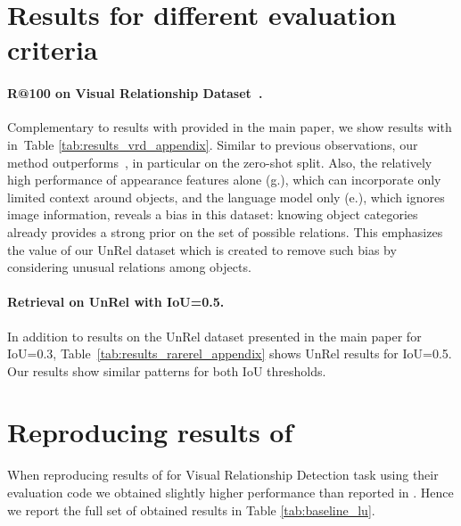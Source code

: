 \documentclass[10pt,twocolumn,letterpaper]{article}
\begin{document}
\section{Results for different evaluation criteria}
\label{part:quantitative}

\paragraph{R@100 on Visual Relationship Dataset~\cite{Lu16}.} Complementary to results with  provided in the main paper, we show results with  in~Table \ref{tab:results_vrd_appendix}. Similar to previous observations, our method outperforms~\cite{Lu16,Sadeghi2011}, in particular on the zero-shot split. Also, the relatively high performance of appearance features alone (g.), which can incorporate only limited context around objects, and the language model only (e.), which ignores image information, reveals a bias in this dataset: knowing object categories already provides a strong prior on the set of possible relations. This emphasizes the value of our UnRel dataset which is created to remove such bias by considering unusual relations among objects.

\paragraph{Retrieval on UnRel with IoU=0.5.}
In addition to results on the UnRel dataset presented in the main paper for IoU=0.3, Table~\ref{tab:results_rarerel_appendix} shows UnRel results for IoU=0.5. Our results show similar patterns for both IoU thresholds. 

\section{Reproducing results of \cite{Lu16}}
\label{part:lu-baseline}
When reproducing results of \cite{Lu16} for Visual Relationship Detection task using their evaluation code we obtained slightly higher performance than reported in \cite{Lu16}. Hence we report the full set of obtained results in Table \ref{tab:baseline_lu}.
\end{document}
